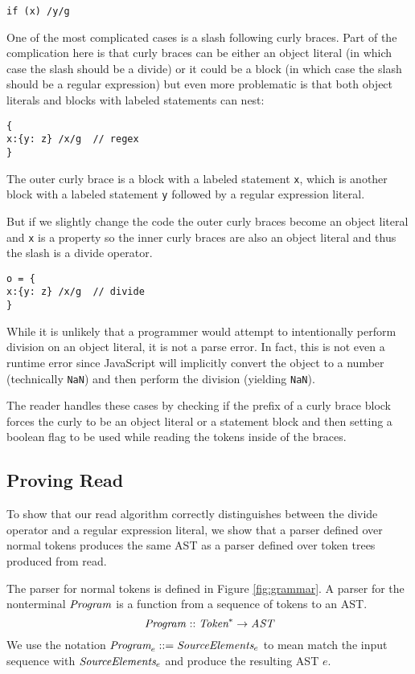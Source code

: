 \documentclass[preprint,10pt]{sigplanconf}
\begin{document}
\begin{lstlisting}
if (x) /y/g  
\end{lstlisting}

One of the most complicated cases is a slash following curly braces.
Part of the  complication here is that curly braces can be either an object
literal (in which case the slash should be a divide) or it could be a
block (in which case the slash should be a regular expression) but
even more problematic is that both object literals and blocks with
labeled statements can nest:

\begin{lstlisting}
{
x:{y: z} /x/g  // regex
}
\end{lstlisting}

The outer curly brace is a block with a labeled statement
\lstinline!x!, which is another block with a labeled statement
\lstinline!y! followed by a regular expression literal.

But if we slightly change the code the outer curly braces become an
object literal and \lstinline!x! is a property so the inner curly
braces are also an object literal and thus the slash is a divide operator.

\begin{lstlisting}
o = {
x:{y: z} /x/g  // divide
}
\end{lstlisting}

While it is unlikely that a programmer would attempt to intentionally
perform division on an object literal, it is not a parse error. In
fact, this is not even a runtime error since JavaScript will
implicitly convert the object to a number (technically
\lstinline!NaN!) and then perform the division (yielding
\lstinline!NaN!).

The reader handles these cases by checking if the prefix of a curly
brace block forces the curly to be an object literal or a statement
block and then setting a boolean flag to be used while reading the
tokens inside of the braces.

\subsection{Proving Read}

To show that our read algorithm correctly distinguishes between the
divide operator and a regular expression literal, we show that
a parser defined over normal tokens produces the same AST as a parser
defined over token trees produced from read.

The parser for normal tokens is defined in Figure \ref{fig:grammar}. A
parser for the nonterminal \( \textit{Program}_{} \) is a function from a
sequence of tokens to an AST.
\[
\textit{Program}_{} :: \textit{Token}^* \rightarrow \textit{AST}
\]
We use the notation $\textit{Program}_{e} ::= \textit{SourceElements}_{e}$
to mean match the input sequence with $\textit{SourceElements}_{e}$ and
produce the resulting AST $e$.
\end{document}
